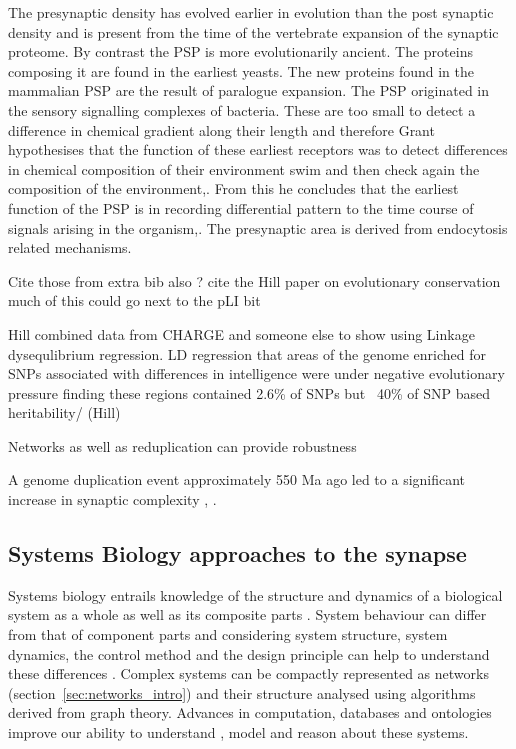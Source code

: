 The presynaptic density has evolved earlier in evolution than the post synaptic density and is present from the time of the vertebrate expansion of the synaptic proteome. By contrast the PSP is more evolutionarily ancient. The proteins composing it are found in the earliest yeasts. The new proteins found in the mammalian PSP are the result of paralogue expansion. The PSP originated in the sensory signalling complexes of bacteria. These are too small to detect a difference in chemical gradient along their length and therefore Grant hypothesises that the function of these earliest receptors was to detect differences in chemical composition of their environment swim and then check again the composition of the environment,. From this he concludes that the earliest function of the PSP is in recording differential pattern to the time course of signals arising in the organism,. The presynaptic area is derived from endocytosis related mechanisms.

Cite those from extra bib also ? cite the Hill paper on evolutionary conservation much of this could go next to the pLI bit

Hill combined data from CHARGE and someone else to show using Linkage dysequlibrium regression. LD regression that areas of the genome enriched for SNPs associated with differences in intelligence were under negative evolutionary pressure finding these regions contained 2.6\% of SNPs but ~40\% of SNP based heritability/ \cite{hill2016molecular} (Hill)

Networks as well as reduplication can provide robustness



 A genome duplication event approximately 550 Ma ago led to a significant increase in synaptic complexity \cite{nithianantharajah2013synaptic} , \cite{grant2016molecular}.

\subsection{Systems Biology approaches to the synapse}

Systems biology entrails knowledge of the structure and dynamics of a biological system as a whole as well as its composite parts \cite{kitano2002systems}. System behaviour can differ from that of component parts and considering system structure, system dynamics, the control method and the design principle can help to understand these differences \cite{kitano2002systems}. Complex systems can be compactly represented as networks (section~\ref{sec:networks_intro}) and their structure analysed using algorithms derived from graph theory. Advances in computation, databases and ontologies improve our ability to understand , model and reason about these systems. 
 
